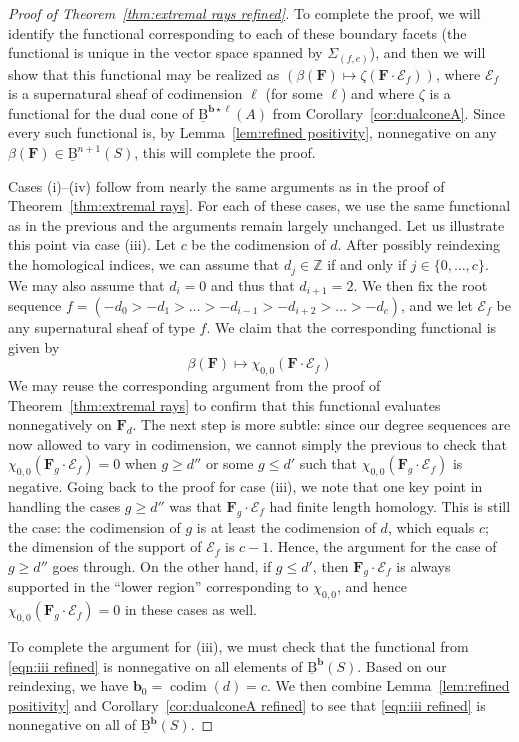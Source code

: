 \documentclass[12pt]{amsart}
\theoremstyle{definition}
\theoremstyle{remark}
\newcommand{\codim}{\operatorname{codim}}
\newcommand{\ZZ}{\mathbb{Z}}
\newcommand{\bb}{\mathbf{b}}
\newcommand{\cE}{\mathcal{E}}
\newcommand{\FF}{\mathbf{F}}
\newcommand{\BBQ}{\underline{\mathrm{B}}}
\begin{document}
\begin{proof}[Proof of Theorem~\ref{thm:extremal rays refined}]
To complete the proof, we will identify the functional corresponding to each of these boundary facets (the functional is unique in the vector space spanned by $\Sigma_{(f,e)}$), and then we will show that this functional may be realized as $(\beta(\FF)\mapsto \zeta(\FF\cdot \cE_f))$, where $\cE_f$ is a supernatural sheaf of codimension $\ell$ (for some $\ell$) and where $\zeta$ is a functional for the dual cone of $\BBQ^{\bb\star \ell}(A)$ from Corollary~\ref{cor:dualconeA}.   Since every such functional is, by Lemma~\ref{lem:refined positivity}, nonnegative on any $\beta(\FF)\in \BBQ^{n+1}(S)$, this will complete the proof.


Cases (i)--(iv) follow from nearly the same arguments as in the proof of Theorem~\ref{thm:extremal rays}.  For each of these cases, we use the same functional as in the previous and the arguments remain largely unchanged.  Let us illustrate this point via case (iii).  Let $c$ be the codimension of $d$.  After possibly reindexing the homological indices, we can assume that $d_j\in \ZZ$ if and only if $j\in \{0, \dots, c\}$.   We may also assume that $d_i=0$ and thus that $d_{i+1}=2$.  We then fix the root sequence $f=(-d_0>-d_1>\dots >-d_{i-1}>-d_{i+2}>\dots >-d_{c})$, and we let $\cE_f$ be any supernatural sheaf of type $f$.  We claim that the corresponding functional is given by
\begin{equation}\label{eqn:iii refined}
\beta(\FF) \mapsto \chi_{0,0}(\FF\cdot \cE_f)
\end{equation}
We may reuse the corresponding argument from the proof of Theorem~\ref{thm:extremal rays} to confirm that this functional evaluates nonnegatively on $\FF_d$.  The next step is more subtle: since our degree sequences are now allowed to vary in codimension, we cannot simply the previous to check that $\chi_{0,0}(\FF_g\cdot \cE_f)=0$ when $g\geq d''$ or some $g\leq d'$ such that $\chi_{0,0}(\FF_g\cdot \cE_f)$ is negative.  Going back to the proof for case (iii), we note that one key point in handling the cases $g\geq d''$ was that $\FF_g\cdot \cE_f$ had finite length homology.  This is still the case: the codimension of $g$ is at least the codimension of $d$, which equals $c$; the dimension of the support of $\cE_f$ is $c-1$.  Hence, the argument for the case of $g\geq d''$ goes through.   On the other hand, if $g\leq d'$, then $\FF_g\cdot \cE_f$ is always supported in the ``lower region'' corresponding to $\chi_{0,0}$, and hence $\chi_{0,0}(\FF_g\cdot \cE_f)=0$ in these cases as well.

To complete the argument for (iii), we must check that the functional from \eqref{eqn:iii refined} is nonnegative on all elements of $\BBQ^{\bb}(S)$.  Based on our reindexing, we have $\bb_0=\codim(d)=c$.  We then combine Lemma~\ref{lem:refined positivity} and Corollary~\ref{cor:dualconeA refined} to see that \eqref{eqn:iii refined} is nonnegative on all of $\BBQ^{\bb}(S)$.


\end{proof}
\end{document}
